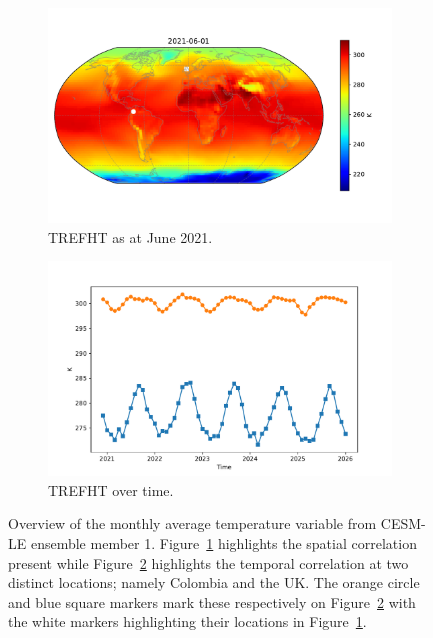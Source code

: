 \begin{figure}[htbp!] 
	\centering
	\begin{subfigure}[b]{0.45\textwidth}
		\includegraphics[width=\textwidth]{TREFHT_example}
		\caption{TREFHT as at June 2021.}
		\label{fig:temp_june}   
	\end{subfigure}             
	\begin{subfigure}[b]{0.45\textwidth}
		\includegraphics[width=\textwidth]{TREFHT_example_temp}
		\caption{TREFHT  over time.}
		\label{fig:temp_temp}
	\end{subfigure}             
	\caption[Overview of the Temperature variable from the CESM-LE dataset.]{Overview of the monthly average temperature variable from CESM-LE ensemble member 1. Figure~\ref{fig:temp_june} highlights the spatial correlation present while Figure~\ref{fig:temp_temp} highlights the temporal correlation at two distinct locations; namely Colombia and the UK. The orange circle and blue square markers mark these respectively on Figure~\ref{fig:temp_temp} with the white markers highlighting their locations in Figure~\ref{fig:temp_june}.}
	\label{fig:temp_overview}
\end{figure}

